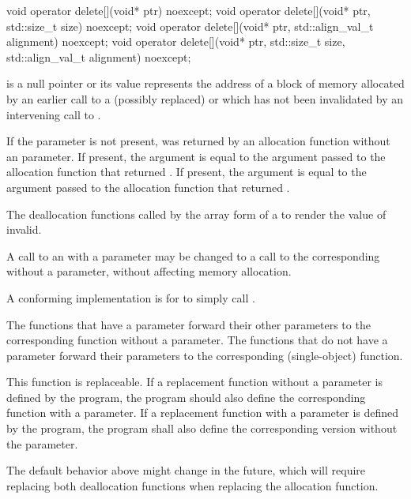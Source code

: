 %
\begin{itemdecl}
void operator delete[](void* ptr) noexcept;
void operator delete[](void* ptr, std::size_t size) noexcept;
void operator delete[](void* ptr, std::align_val_t alignment) noexcept;
void operator delete[](void* ptr, std::size_t size, std::align_val_t alignment) noexcept;
\end{itemdecl}

\begin{itemdescr}
\pnum
\expects
{} is a null pointer or
its value represents the address of
a block of memory allocated by
an earlier call to a (possibly replaced)
or
which has not been invalidated by an intervening call to
.

\pnum
If the  parameter is not present,
 was returned by an allocation function
without an  parameter.
If present, the  argument
is equal to the  argument
passed to the allocation function that returned .
If present, the  argument
is equal to the  argument
passed to the allocation function that returned .

\pnum
\effects
The
deallocation functions
called by the array form of a
to render the value of  invalid.

\pnum
\required
A call to an 
with a  parameter
may be changed to
a call to the corresponding 
without a  parameter,
without affecting memory allocation.
\begin{note}
A conforming implementation is for
 to simply call
.
\end{note}

\pnum
{}
The functions that have a  parameter
forward their other parameters
to the corresponding function without a  parameter.
The functions that do not have a  parameter
forward their parameters
to the corresponding  (single-object) function.

\pnum
\remarks
This function is replaceable.
If a replacement function
without a  parameter
is defined by the program,
the program should also define the corresponding
function with a  parameter.
If a replacement function
with a  parameter
is defined by the program,
the program shall also define the corresponding
version without the  parameter.
\begin{note}
The default behavior above might change in the future,
which will require replacing both deallocation functions
when replacing the allocation function.
\end{note}
\end{itemdescr}

